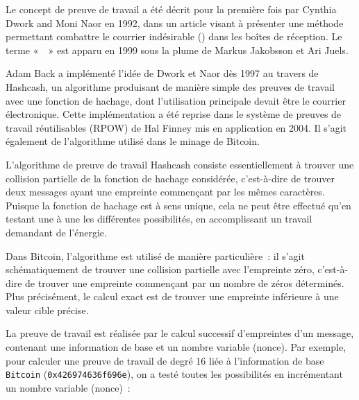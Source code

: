 Le concept de preuve de travail a été décrit pour la première fois par Cynthia Dwork and Moni Naor en 1992, dans un article visant à présenter une méthode permettant combattre le courrier indésirable () dans les boîtes de réception. Le terme «~~» est apparu en 1999 sous la plume de Markus Jakobsson et Ari Juels.

Adam Back a implémenté l'idée de Dwork et Naor dès 1997 au travers de Hashcash, un algorithme produisant de manière simple des preuves de travail avec une fonction de hachage, dont l'utilisation principale devait être le courrier électronique. Cette implémentation a été reprise dans le système de preuves de travail réutilisables (RPOW) de Hal Finney mis en application en 2004. Il s'agit également de l'algorithme utilisé dans le minage de Bitcoin.

L'algorithme de preuve de travail Hashcash consiste essentiellement à trouver une collision partielle de la fonction de hachage considérée, c'est-à-dire de trouver deux messages ayant une empreinte commençant par les mêmes caractères. Puisque la fonction de hachage est à sens unique, cela ne peut être effectué qu'en testant une à une les différentes possibilités, en accomplissant un travail demandant de l'énergie.

Dans Bitcoin, l'algorithme est utilisé de manière particulière~: il s'agit schématiquement de trouver une collision partielle avec l'empreinte zéro, c'est-à-dire de trouver une empreinte commençant par un nombre de zéros déterminés. Plus précisément, le calcul exact est de trouver une empreinte inférieure à une valeur cible précise.

La preuve de travail est réalisée par le calcul successif d'empreintes d'un message, contenant une information de base et un nombre variable (nonce). Par exemple, pour calculer une preuve de travail de degré 16 liée à l'information de base \texttt{Bitcoin} (\texttt{0x426974636f696e}), on a testé toutes les possibilités en incrémentant un nombre variable (nonce)~:

